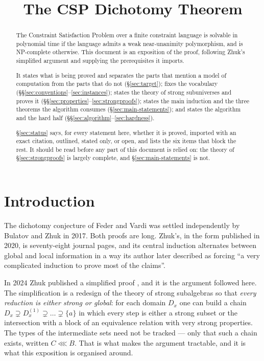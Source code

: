 \documentclass[11pt]{article}
\title{The CSP Dichotomy Theorem}
\author{}\date{}
\begin{document}
\maketitle\vspace{-2.2em}
\begin{abstract}
The Constraint Satisfaction Problem over a finite constraint language is
solvable in polynomial time if the language admits a weak near-unanimity
polymorphism, and is \textup{NP}-complete otherwise. This document is an
exposition of the proof, following Zhuk's simplified argument
\cite{ZhukSimplified} and supplying the prerequisites it imports.

It states what is being proved and separates the parts that mention a model of
computation from the parts that do not (\S\ref{sec:target}); fixes the
vocabulary (\S\S\ref{sec:conventions}--\ref{sec:instances}); states the theory
of strong subuniverses and proves it
(\S\S\ref{sec:properties}--\ref{sec:strongproofs}); states the main induction
and the three theorems the algorithm consumes (\S\ref{sec:main-statements});
and states the algorithm and the hard half
(\S\S\ref{sec:algorithm}--\ref{sec:hardness}).

\S\ref{sec:status} says, for every statement here, whether it is proved,
imported with an exact citation, outlined, stated only, or open, and lists the
six items that block the rest. It should be read before any part of this
document is relied on: the theory of \S\ref{sec:strongproofs} is largely
complete, and \S\ref{sec:main-statements} is not.
\end{abstract}

\tableofcontents\clearpage

\section*{Introduction}

The dichotomy conjecture of Feder and Vardi \cite{FederVardi} was settled
independently by Bulatov \cite{Bulatov} and Zhuk \cite{ZhukJACM} in 2017. Both
proofs are long. Zhuk's, in the form published in 2020, is seventy-eight
journal pages, and its central induction alternates between global and local
information in a way its author later described as forcing ``a very complicated
induction to prove most of the claims''.

In 2024 Zhuk published a simplified proof \cite{ZhukSimplified}, and it is the
argument followed here. The simplification is a redesign of the theory of
strong subalgebras so that \emph{every reduction is either strong or global}:
for each domain $D_{x}$ one can build a chain
$D_{x}\supsetneq D_{x}^{(1)}\supsetneq\dots\supsetneq\{a\}$ in which every step
is either a strong subset or the intersection with a block of an equivalence
relation with very strong properties. The types of the intermediate sets need
not be tracked --- only that such a chain exists, written $C\lll B$. That is
what makes the argument tractable, and it is what this exposition is organised
around.
\end{document}
